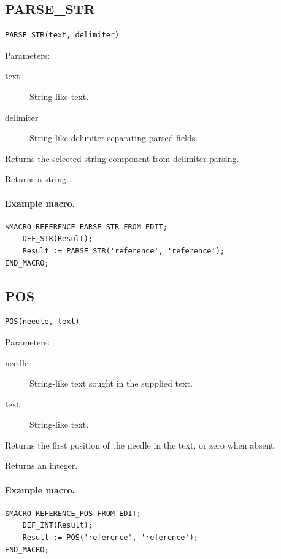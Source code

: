 \documentclass[a4paper,10pt,twoside,openany]{book}
\begin{document}
\label{prim:intrinsic-parse-str}
\subsection*{PARSE\_STR}
\begin{verbatim}
PARSE_STR(text, delimiter)
\end{verbatim}
Parameters:
\begin{description}
\item[text] String-like text.
\item[delimiter] String-like delimiter separating parsed fields.
\end{description}

Returns the selected string component from delimiter parsing.

Returns a string.

\paragraph{Example macro.}
\begin{verbatim}
$MACRO REFERENCE_PARSE_STR FROM EDIT;
    DEF_STR(Result);
    Result := PARSE_STR('reference', 'reference');
END_MACRO;
\end{verbatim}

\label{prim:intrinsic-pos}
\subsection*{POS}
\begin{verbatim}
POS(needle, text)
\end{verbatim}
Parameters:
\begin{description}
\item[needle] String-like text sought in the supplied text.
\item[text] String-like text.
\end{description}

Returns the first position of the needle in the text, or zero when absent.

Returns an integer.

\paragraph{Example macro.}
\begin{verbatim}
$MACRO REFERENCE_POS FROM EDIT;
    DEF_INT(Result);
    Result := POS('reference', 'reference');
END_MACRO;
\end{verbatim}
\end{document}
